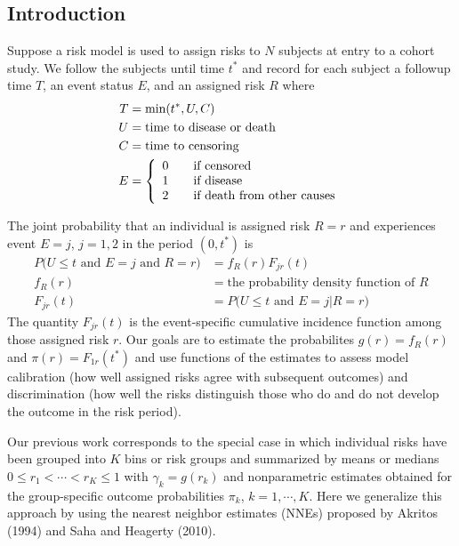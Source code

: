 \documentclass[11pt]{article}
\begin{document}
\subsection{Introduction}

Suppose a risk model is used to assign risks to $N$ subjects at entry
to a cohort study.  We follow the subjects until time $t^*$ and record
for each subject a followup time $T$, an event status $E$, and an
assigned risk $R$ where
\begin{align}
T & = \text{min}(t^*, U, C)\\
U & = \text{time to disease or death}\\
C & = \text{time to censoring}\\
E & =   \left\{
  \begin{array}{l l}
    0 & \quad \text{if censored}\\
    1 & \quad \text{if disease}\\
    2 & \quad \text{if death from other causes}\\
  \end{array} \right.
\end{align}

The joint probability that an individual is assigned risk $R = r$ and
experiences event $E = j$, $j = 1,2$ in the period $(0, t^*)$ is
\begin{align}
P\big(U \le t \text{ and } E = j \text{ and } R = r \big) & = f_R(r) F_{jr}(t)\\
f_R(r) & = \text{the probability density function of } R\\
F_{jr}(t) & = P\big(U \le t \text{ and } E = j \big| R = r \big)
\end{align}
The quantity $F_{jr}(t)$ is the event-specific cumulative incidence
function among those assigned risk $r$. Our goals are to estimate the
probabilites $g(r) = f_R(r)$ and $\pi(r) = F_{1r}(t^*)$ and use
functions of the estimates to assess model calibration (how well
assigned risks agree with subsequent outcomes) and discrimination
(how well the risks distinguish those who do and do not develop the
outcome in the risk period).

Our previous work corresponds to the special case in which individual
risks have been grouped into $K$ bins or risk groups and summarized by means or
medians $0 \le r_1 < \cdots < r_K \le 1$ with $\gamma_k = g(r_k)$ and
nonparametric estimates obtained for the group-specific outcome
probabilities $\pi_k$, $k = 1, \cdots, K$. Here we generalize this
approach by using the nearest neighbor estimates (NNEs) proposed by
Akritos (1994) and Saha and Heagerty (2010).
\end{document}
